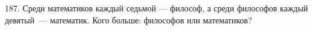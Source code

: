 187. Среди математиков каждый седьмой --- философ, а среди философов каждый девятый --- математик. Кого больше: философов или математиков?\\
